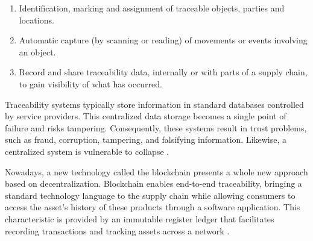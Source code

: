 \begin{enumerate}
\item Identification, marking and assignment of traceable objects, parties and locations.
\item Automatic capture (by scanning or reading) of movements or events involving an object.
\item Record and share traceability data, internally or with parts of a supply chain, to gain visibility of what has occurred.
\end{enumerate}

Traceability systems typically store information in standard databases controlled by service providers. This centralized data storage becomes a single point of failure and risks tampering. Consequently, these systems result in trust problems, such as fraud, corruption, tampering, and falsifying information. Likewise, a centralized system is vulnerable to collapse \cite{tian2017supply}.

Nowadays, a new technology called the blockchain presents a whole new approach based on decentralization. Blockchain enables end-to-end traceability, bringing a standard technology language to the supply chain while allowing consumers to access the asset's history of these products through a software application. This characteristic is provided by an immutable register ledger that facilitates recording transactions and tracking assets across a network \cite{galvez2018future}.